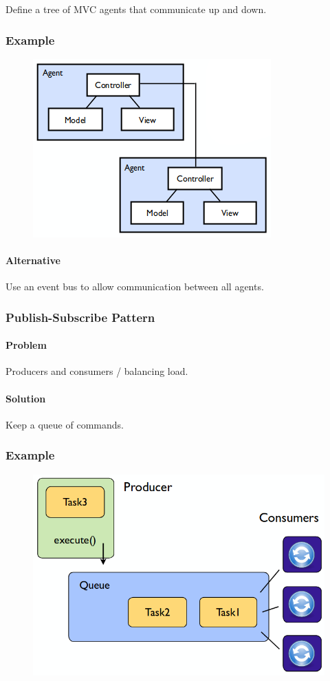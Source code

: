 \documentclass[twocolumn,english]{article}
\begin{document}
Define a tree of MVC agents that communicate up and down.

\subsubsection*{Example}

\begin{figure}[H]
\centering{}\includegraphics[width=0.4\columnwidth]{img/pac}
\end{figure}

\paragraph{Alternative}

Use an event bus to allow communication between all agents.

\subsubsection{Publish-Subscribe Pattern}

\paragraph{Problem}

Producers and consumers / balancing load.

\paragraph{Solution}

Keep a queue of commands.

\subsubsection*{Example}

\begin{figure}[H]
\centering{}\includegraphics[width=0.4\columnwidth]{img/pubsub}
\end{figure}
\end{document}
